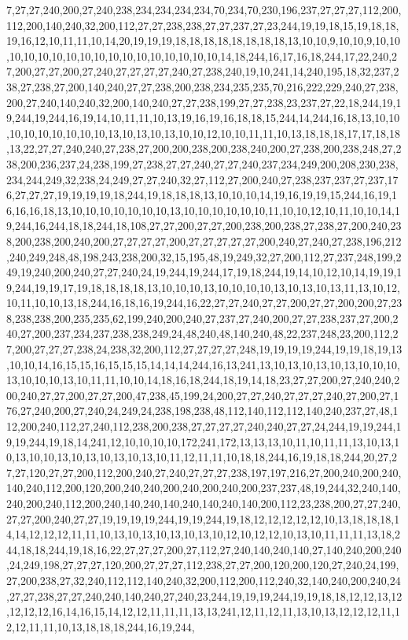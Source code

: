 7,27,27,240,200,27,240,238,234,234,234,234,70,234,70,230,196,237,27,27,27,112,200,112,200,140,240,32,200,112,27,27,238,238,27,27,237,27,23,244,19,19,18,15,19,18,18,19,16,12,10,11,11,10,14,20,19,19,19,18,18,18,18,18,18,18,18,13,10,10,9,10,10,9,10,10,10,10,10,10,10,10,10,10,10,10,10,10,10,10,10,14,18,244,16,17,16,18,244,17,22,240,27,200,27,27,200,27,240,27,27,27,27,240,27,238,240,19,10,241,14,240,195,18,32,237,238,27,238,27,200,140,240,27,27,238,200,238,234,235,235,70,216,222,229,240,27,238,200,27,240,140,240,32,200,140,240,27,27,238,199,27,27,238,23,237,27,22,18,244,19,19,244,19,244,16,19,14,10,11,11,10,13,19,16,19,16,18,18,15,244,14,244,16,18,13,10,10,10,10,10,10,10,10,10,13,10,13,10,13,10,10,12,10,10,11,11,10,13,18,18,18,17,17,18,18,13,22,27,27,240,240,27,238,27,200,200,238,200,238,240,200,27,238,200,238,248,27,238,200,236,237,24,238,199,27,238,27,27,240,27,27,240,237,234,249,200,208,230,238,234,244,249,32,238,24,249,27,27,240,32,27,112,27,200,240,27,238,237,237,27,237,176,27,27,27,19,19,19,19,18,244,19,18,18,18,13,10,10,10,14,19,16,19,19,15,244,16,19,16,16,16,18,13,10,10,10,10,10,10,10,13,10,10,10,10,10,10,11,10,10,12,10,11,10,10,14,19,244,16,244,18,18,244,18,108,27,27,200,27,27,200,238,200,238,27,238,27,200,240,238,200,238,200,240,200,27,27,27,27,200,27,27,27,27,27,200,240,27,240,27,238,196,212,240,249,248,48,198,243,238,200,32,15,195,48,19,249,32,27,200,112,27,237,248,199,249,19,240,200,240,27,27,240,24,19,244,19,244,17,19,18,244,19,14,10,12,10,14,19,19,19,244,19,19,17,19,18,18,18,18,13,10,10,10,13,10,10,10,10,13,10,13,10,13,11,13,10,12,10,11,10,10,13,18,244,16,18,16,19,244,16,22,27,27,240,27,27,200,27,27,200,200,27,238,238,238,200,235,235,62,199,240,200,240,27,237,27,240,200,27,27,238,237,27,200,240,27,200,237,234,237,238,238,249,24,48,240,48,140,240,48,22,237,248,23,200,112,27,200,27,27,27,238,24,238,32,200,112,27,27,27,27,248,19,19,19,19,244,19,19,18,19,13,10,10,14,16,15,15,16,15,15,15,14,14,14,244,16,13,241,13,10,13,10,13,10,13,10,10,10,13,10,10,10,13,10,11,11,10,10,14,18,16,18,244,18,19,14,18,23,27,27,200,27,240,240,200,240,27,27,200,27,27,200,47,238,45,199,24,200,27,27,240,27,27,27,240,27,200,27,176,27,240,200,27,240,24,249,24,238,198,238,48,112,140,112,112,140,240,237,27,48,112,200,240,112,27,240,112,238,200,238,27,27,27,27,240,240,27,27,24,244,19,19,244,19,19,244,19,18,14,241,12,10,10,10,10,172,241,172,13,13,13,10,11,10,11,11,13,10,13,10,13,10,10,13,10,13,10,13,10,13,10,11,12,11,11,10,18,18,244,16,19,18,18,244,20,27,27,27,120,27,27,200,112,200,240,27,240,27,27,27,238,197,197,216,27,200,240,200,240,140,240,112,200,120,200,240,240,200,240,200,240,200,237,237,48,19,244,32,240,140,240,200,240,112,200,240,140,240,140,240,140,240,140,200,112,23,238,200,27,27,240,27,27,200,240,27,27,19,19,19,19,244,19,19,244,19,18,12,12,12,12,12,10,13,18,18,18,14,14,12,12,12,11,11,10,13,10,13,10,13,10,13,10,12,10,12,12,10,13,10,11,11,11,13,18,244,18,18,244,19,18,16,22,27,27,27,200,27,112,27,240,140,240,140,27,140,240,200,240,24,249,198,27,27,27,120,200,27,27,27,112,238,27,27,200,120,200,120,27,240,24,199,27,200,238,27,32,240,112,112,140,240,32,200,112,200,112,240,32,140,240,200,240,24,27,27,238,27,27,240,240,140,240,27,240,23,244,19,19,19,244,19,19,18,18,12,12,13,12,12,12,12,16,14,16,15,14,12,12,11,11,11,13,13,241,12,11,12,11,13,10,13,12,12,12,11,12,12,11,11,10,13,18,18,18,244,16,19,244,